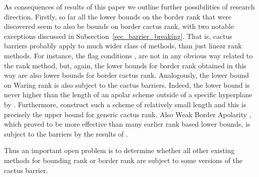 \documentclass[12pt,a4paper]{article}
\begin{document}
As consequences of results of this paper we outline further possibilities of research direction.
Firstly, so far all the lower bounds on the border rank that were discovered seem to also be bounds on border cactus rank, with two notable exceptions discussed in Subsection~\ref{sec_barrier_breaking}.
That is, cactus barriers probably apply to much wider class of methods, than just linear rank methods.
For instance, the flag conditions
\cite[Cor.~2.3]{landsberg_michalek_abelian_tensors},
\cite[Prop.~2.3 and 2.5]{conner_huang_landsberg_bad_and_good_news}
are not in any obvious way related to the rank method,
but, again, the lower bounds for border rank obtained in this way are also lower bounds for border cactus rank.
Analogously,
the lower bound on Waring rank \cite[Prop.~4]{jabu_teitler_examples_of_forms_of_high_rank}
is also subject to the cactus barriers. Indeed,
the lower bound is never higher than the length of an apolar scheme outside of a specific hyperplane by \cite[Rem.~6]{jabu_teitler_examples_of_forms_of_high_rank}.
Furthermore, \cite[Thm~3]{bernardi_ranestad_cactus_rank_of_cubics} construct such a scheme of relatively small length and this is precisely the upper bound for generic cactus rank.
Also Weak Border Apolarity
\cite[Thm~1.2]{nisiabu_jabu_border_apolarity}, which proved to be more effective than many earlier rank based lower bounds,
is subject to the barriers by the results of
\cite[Thm~1.2]{nisiabu_jabu_abcd}.

Thus an important open problem is to determine whether all other existing methods for bounding rank or border rank are subject to some versions of the cactus barrier.
\end{document}
